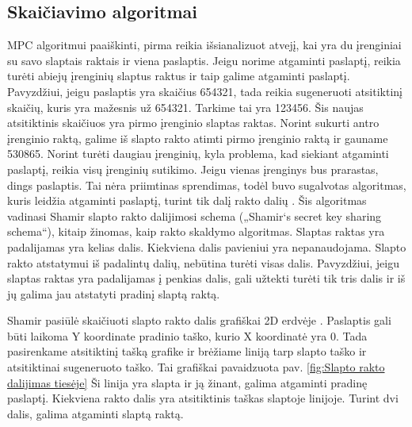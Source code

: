 \documentclass{VUMIFInfBakalaurinis}
\begin{document}
\subsection{Skaičiavimo algoritmai}
\par MPC algoritmui paaiškinti, pirma reikia išsianalizuot atvejį, kai yra du įrenginiai su savo slaptais raktais ir viena paslaptis. Jeigu norime atgaminti paslaptį, reikia turėti abiejų įrenginių slaptus raktus ir taip galime atgaminti paslaptį. Pavyzdžiui, jeigu paslaptis yra skaičius 654321, tada reikia sugeneruoti atsitiktinį skaičių, kuris yra mažesnis už 654321. Tarkime tai yra 123456. Šis naujas atsitiktinis skaičiuos yra pirmo įrenginio slaptas raktas. Norint sukurti antro įrenginio raktą, galime iš slapto rakto atimti pirmo įrenginio raktą ir gauname 530865. Norint turėti daugiau įrenginių, kyla problema, kad siekiant atgaminti paslaptį, reikia visų įrenginių sutikimo. Jeigu vienas įrenginys bus prarastas, dings paslaptis. Tai nėra priimtinas sprendimas, todėl buvo sugalvotas algoritmas, kuris leidžia atgaminti paslaptį, turint tik dalį rakto dalių \cite{23}. Šis algoritmas vadinasi Shamir slapto rakto dalijimosi schema („Shamir‘s secret key sharing schema“), kitaip žinomas, kaip rakto skaldymo algoritmas. Slaptas raktas yra padalijamas yra kelias dalis. Kiekviena dalis pavieniui yra nepanaudojama. Slapto rakto atstatymui iš padalintų dalių, nebūtina turėti visas dalis. Pavyzdžiui, jeigu slaptas raktas yra padalijamas į penkias dalis, gali užtekti turėti tik tris dalis ir iš jų galima jau atstatyti pradinį slaptą raktą.
\par Shamir pasiūlė skaičiuoti slapto rakto dalis grafiškai 2D erdvėje \cite{23}. Paslaptis gali būti laikoma Y koordinate pradinio taško, kurio X koordinatė yra 0. Tada pasirenkame atsitiktinį tašką grafike ir brėžiame liniją tarp slapto taško ir atsitiktinai sugeneruoto taško. Tai grafiškai pavaidzuota pav. \ref{fig:Slapto rakto dalijimas tiesėje} Ši linija yra slapta ir ją žinant, galima atgaminti pradinę paslaptį. Kiekviena rakto dalis yra atsitiktinis taškas slaptoje linijoje. Turint dvi dalis, galima atgaminti slaptą raktą.  
\end{document}
